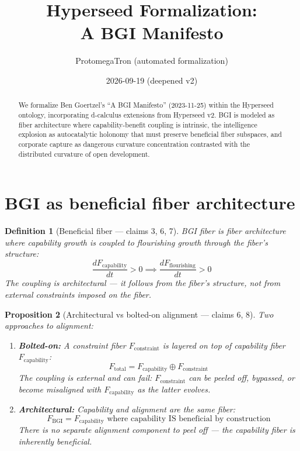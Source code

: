 \documentclass[11pt,a4paper]{article}
\title{Hyperseed Formalization:\\
  A BGI Manifesto}
\author{ProtomegaTron (automated formalization)}
\date{2026-09-19 (deepened v2)}
\newtheorem{definition}{Definition}[section]
\newtheorem{proposition}[definition]{Proposition}
\begin{document}
\maketitle

\begin{abstract}
We formalize Ben Goertzel's ``A BGI Manifesto'' (2023-11-25) within the
Hyperseed ontology, incorporating d-calculus extensions from Hyperseed v2.
BGI is modeled as fiber architecture where capability-benefit coupling is
intrinsic, the intelligence explosion as autocatalytic holonomy that must
preserve beneficial fiber subspaces, and corporate capture as dangerous
curvature concentration contrasted with the distributed curvature of
open development.
\end{abstract}

\tableofcontents

\section{BGI as beneficial fiber architecture}

\begin{definition}[Beneficial fiber --- claims 3, 6, 7]
\emph{BGI fiber} is fiber architecture where capability growth is coupled
to flourishing growth through the fiber's structure:
\[
  \frac{dF_{\text{capability}}}{dt} > 0 \implies
  \frac{dF_{\text{flourishing}}}{dt} > 0
\]
The coupling is architectural --- it follows from the fiber's structure,
not from external constraints imposed on the fiber.
\end{definition}

\begin{proposition}[Architectural vs bolted-on alignment --- claims 6, 8]
\label{prop:arch}
Two approaches to alignment:
\begin{enumerate}
  \item \textbf{Bolted-on:} A constraint fiber $F_{\text{constraint}}$
    is layered on top of capability fiber $F_{\text{capability}}$:
    \[
      F_{\text{total}} = F_{\text{capability}} \oplus F_{\text{constraint}}
    \]
    The coupling is external and can fail: $F_{\text{constraint}}$ can
    be peeled off, bypassed, or become misaligned with
    $F_{\text{capability}}$ as the latter evolves.

  \item \textbf{Architectural:} Capability and alignment are the same fiber:
    \[
      F_{\text{BGI}} = F_{\text{capability}} \text{ where capability IS
        beneficial by construction}
    \]
    There is no separate alignment component to peel off --- the
    capability fiber is inherently beneficial.
\end{enumerate}
\end{proposition}
\end{document}
